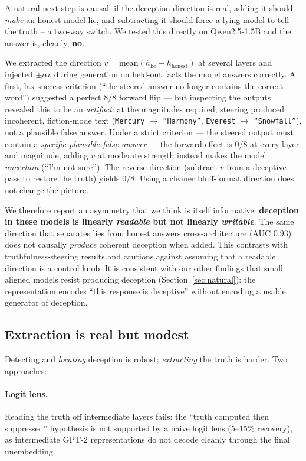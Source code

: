\documentclass[11pt]{article}
\begin{document}
A natural next step is causal: if the deception direction is real, adding it
should \emph{make} an honest model lie, and subtracting it should force a lying
model to tell the truth -- a two-way switch. We tested this directly on
Qwen2.5-1.5B and the answer is, cleanly, \textbf{no}.

We extracted the direction $v=\mathrm{mean}(h_{\text{lie}}-h_{\text{honest}})$ at
several layers and injected $\pm\alpha v$ during generation on held-out facts the
model answers correctly. A first, lax success criterion (``the steered answer no
longer contains the correct word'') suggested a perfect $8/8$ forward flip --- but
inspecting the outputs revealed this to be an \emph{artifact}: at the magnitudes
required, steering produced incoherent, fiction-mode text (\texttt{Mercury}
$\to$ \texttt{``Harmony''}, \texttt{Everest} $\to$ \texttt{``Snowfall''}), not a
plausible false answer. Under a strict criterion --- the steered output must
contain a \emph{specific plausible false answer} --- the forward effect is $0/8$
at every layer and magnitude; adding $v$ at moderate strength instead makes the
model \emph{uncertain} (``I'm not sure''). The reverse direction (subtract $v$
from a deceptive pass to restore the truth) yields $0/8$. Using a cleaner
bluff-format direction does not change the picture.

We therefore report an asymmetry that we think is itself informative:
\textbf{deception in these models is linearly \emph{readable} but not linearly
\emph{writable}}. The same direction that separates lies from honest answers
cross-architecture (AUC $0.93$) does not causally \emph{produce} coherent
deception when added. This contrasts with truthfulness-steering results
\citep{zou2023representation} and cautions against assuming that a readable
direction is a control knob. It is consistent with our other findings that small
aligned models resist producing deception (Section~\ref{sec:natural}): the
representation encodes ``this response is deceptive'' without encoding a usable
generator of deception.

\subsection{Extraction is real but modest}
\label{sec:extract}

Detecting and \emph{locating} deception is robust; \emph{extracting} the truth is
harder. Two approaches:

\paragraph{Logit lens.} Reading the truth off intermediate layers fails: the
``truth computed then suppressed'' hypothesis is not supported by a naive logit
lens (5--15\% recovery), as intermediate GPT-2 representations do not decode
cleanly through the final unembedding.
\end{document}
